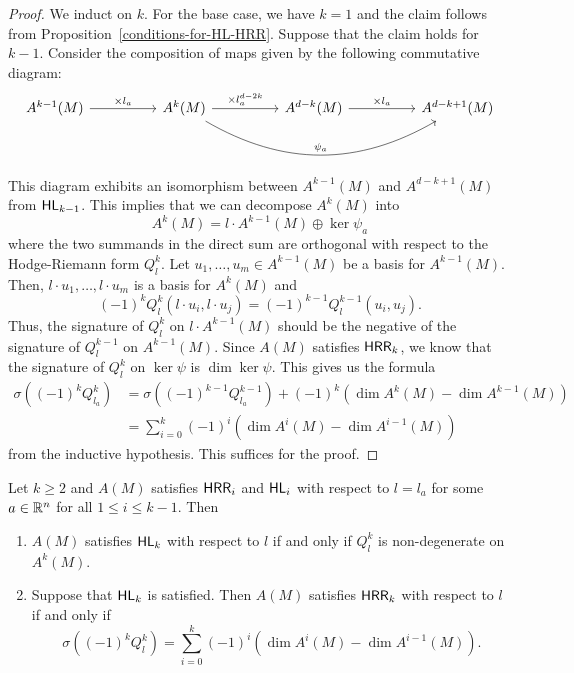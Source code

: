 \documentclass{puthesis-UG}
\begin{document}
\begin{proof}
	We induct on $k$. For the base case, we have $k = 1$ and the claim follows from Proposition~\ref{conditions-for-HL-HRR}. Suppose that the claim holds for $k-1$. Consider the composition of maps given by the following commutative diagram:
	\begin{equation} \label{important-composition}
		\begin{tikzcd}
			{A^{k-1}(M)} && {A^k(M)} && {A^{d-k}(M)} && {A^{d-k+1}(M)}
			\arrow["{\times l_a}", from=1-1, to=1-3]
			\arrow["{\times l_a^{d-2k}}", from=1-3, to=1-5]
			\arrow["{\times l_a}", from=1-5, to=1-7]
			\arrow["{\psi_a}", bend right = 30, from=1-3, to=1-7]
		\end{tikzcd}
	\end{equation}
	This diagram exhibits an isomorphism between $A^{k-1}(M)$ and $A^{d-k+1}(M)$ from $\mathsf{HL}_{k-1}$. This implies that we can decompose $A^k(M)$ into 
	\[
		A^k(M) = l \cdot A^{k-1}(M) \oplus \ker \psi_a
	\] 
	where the two summands in the direct sum are orthogonal with respect to the Hodge-Riemann form $Q_l^k$. Let $u_1, \ldots, u_m \in A^{k-1}(M)$ be a basis for $A^{k-1}(M)$. Then, $l \cdot u_1, \ldots, l \cdot u_m$ is a basis for $A^k(M)$ and
	\[
		(-1)^{k} Q_{l}^k (l \cdot u_i, l \cdot u_j) = (-1)^{k-1} Q_{l}^{k-1} (u_i, u_j). 
	\]
	Thus, the signature of $Q_{l}^k$ on $l \cdot A^{k-1}(M)$ should be the negative of the signature of $Q_{l}^{k-1}$ on $A^{k-1}(M)$. Since $A(M)$ satisfies $\mathsf{HRR}_k$, we know that the signature of $Q_l^k$ on $\ker \psi$ is $\dim \ker \psi$. This gives us the formula
	\begin{align*}
		\sigma ((-1)^k Q_{l_a}^k) & = \sigma \left((-1)^{k-1} Q_{l_a}^{k-1}\right) + (-1)^k (\dim A^k(M) - \dim A^{k-1}(M)) \\
		& = \sum_{i = 0}^k (-1)^i (\dim A^i(M) - \dim A^{i-1}(M))
	\end{align*}
	from the inductive hypothesis. This suffices for the proof. 
\end{proof}
\begin{lem} \label{sufficient-conditions-for-higher-HRR}
	Let $k \geq 2$ and $A(M)$ satisfies $\mathsf{HRR}_{i}$ and $\mathsf{HL}_{i}$ with respect to $l = l_a$ for some $a \in \mathbb{R}^n$ for all $1 \leq i \leq k-1$. Then
	\begin{enumerate}[label = (\alph*)]
		\item $A(M)$ satisfies $\mathsf{HL}_k$ with respect to $l$ if and only if $Q_l^k$ is non-degenerate on $A^k(M)$. 

		\item Suppose that $\mathsf{HL}_k$ is satisfied. Then $A(M)$ satisfies $\mathsf{HRR}_k$ with respect to $l$ if and only if 
		\[
			\sigma ((-1)^kQ_l^k) = \sum_{i = 0}^k (-1)^i (\dim A^i(M) - \dim A^{i-1}(M)).
		\]
	\end{enumerate}
\end{lem}
\end{document}

